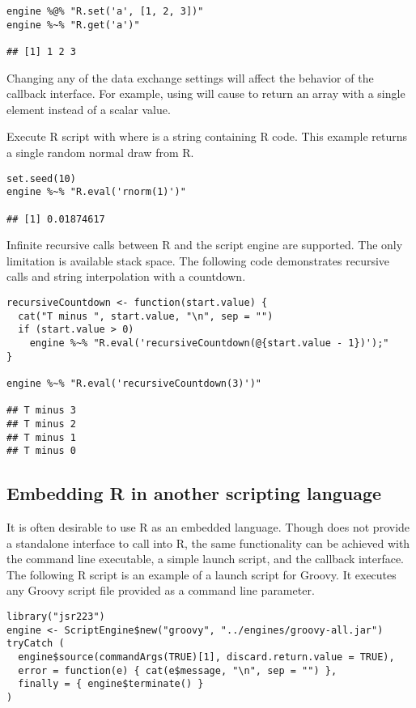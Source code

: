 \begin{verbatim}
engine %@% "R.set('a', [1, 2, 3])"
engine %~% "R.get('a')"

## [1] 1 2 3
\end{verbatim}

 Changing any of the data exchange settings will affect the behavior of the callback interface. For example, using  will cause  to return an array with a single element instead of a scalar value.

Execute R script with  where  is a string containing R code. This example returns a single random normal draw from R.

\begin{verbatim}
set.seed(10)
engine %~% "R.eval('rnorm(1)')"

## [1] 0.01874617
\end{verbatim}

Infinite recursive calls between R and the script engine are supported. The only limitation is available stack space. The following code demonstrates recursive calls and string interpolation with a countdown.

\begin{verbatim}
recursiveCountdown <- function(start.value) {
  cat("T minus ", start.value, "\n", sep = "")
  if (start.value > 0)
    engine %~% "R.eval('recursiveCountdown(@{start.value - 1})');"
}

engine %~% "R.eval('recursiveCountdown(3)')"

## T minus 3
## T minus 2
## T minus 1
## T minus 0
\end{verbatim}

\subsection{Embedding R in another scripting language}

It is often desirable to use R as an embedded language. Though  does not provide a standalone interface to call into R, the same functionality can be achieved with the  command line executable, a simple launch script, and the  callback interface. The following R script is an example of a launch script for Groovy. It executes any Groovy script file provided as a command line parameter.

\begin{verbatim}
library("jsr223")
engine <- ScriptEngine$new("groovy", "../engines/groovy-all.jar")
tryCatch (
  engine$source(commandArgs(TRUE)[1], discard.return.value = TRUE),
  error = function(e) { cat(e$message, "\n", sep = "") },
  finally = { engine$terminate() }
)
\end{verbatim}

